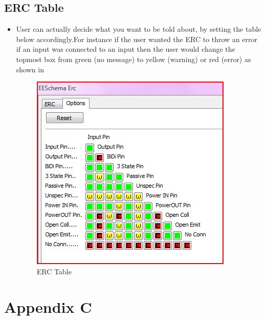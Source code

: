 \subsection{ERC Table}

     \begin{itemize}   

\item User can actually decide what you want to be told about, by setting the table below accordingly.For instance if the user wanted the ERC to throw an error if an input was connected to an input then the user would change the topmost box from green (no message) to yellow (warning) or red (error) as shown in  

        \begin{figure}[!htp]
            \centering
            \includegraphics[width =\lgfig]{erctable.jpg}
            \caption{ERC Table}
            \label{erc_table}
         \end{figure}
\end {itemize}

  \section{Appendix C}
